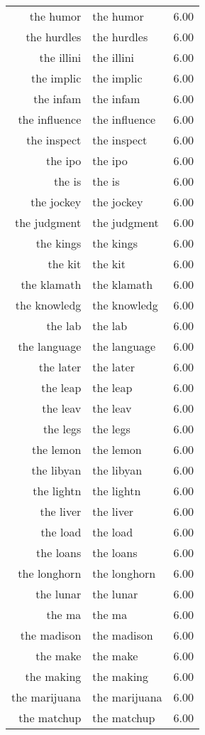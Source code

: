 \begin{table}[ht]
\begin{tabular}{rlr}
  the humor & the humor & 6.00 \\ 
  the hurdles & the hurdles & 6.00 \\ 
  the illini & the illini & 6.00 \\ 
  the implic & the implic & 6.00 \\ 
  the infam & the infam & 6.00 \\ 
  the influence & the influence & 6.00 \\ 
  the inspect & the inspect & 6.00 \\ 
  the ipo & the ipo & 6.00 \\ 
  the is & the is & 6.00 \\ 
  the jockey & the jockey & 6.00 \\ 
  the judgment & the judgment & 6.00 \\ 
  the kings & the kings & 6.00 \\ 
  the kit & the kit & 6.00 \\ 
  the klamath & the klamath & 6.00 \\ 
  the knowledg & the knowledg & 6.00 \\ 
  the lab & the lab & 6.00 \\ 
  the language & the language & 6.00 \\ 
  the later & the later & 6.00 \\ 
  the leap & the leap & 6.00 \\ 
  the leav & the leav & 6.00 \\ 
  the legs & the legs & 6.00 \\ 
  the lemon & the lemon & 6.00 \\ 
  the libyan & the libyan & 6.00 \\ 
  the lightn & the lightn & 6.00 \\ 
  the liver & the liver & 6.00 \\ 
  the load & the load & 6.00 \\ 
  the loans & the loans & 6.00 \\ 
  the longhorn & the longhorn & 6.00 \\ 
  the lunar & the lunar & 6.00 \\ 
  the ma & the ma & 6.00 \\ 
  the madison & the madison & 6.00 \\ 
  the make & the make & 6.00 \\ 
  the making & the making & 6.00 \\ 
  the marijuana & the marijuana & 6.00 \\ 
  the matchup & the matchup & 6.00 \\ 

\end{tabular}
\end{table}
